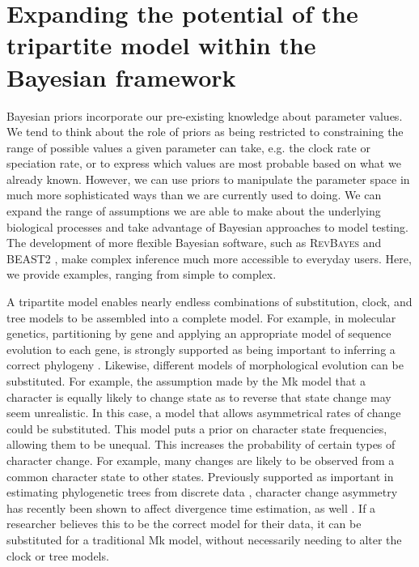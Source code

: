 \section{Expanding the potential of the tripartite model within the Bayesian framework}

Bayesian priors incorporate our pre-existing knowledge about parameter values. %
We tend to think about the role of priors as being restricted to  constraining the range of possible values a given parameter can take, e.g. the clock rate or speciation rate, or to express which values are most probable based on what we already known.
However, we can use priors to manipulate the parameter space in much more sophisticated ways than we are currently used to doing.
We can expand the range of assumptions we are able to make about the underlying biological processes and take advantage of Bayesian approaches to model testing.
The development of more flexible Bayesian software, such as \textsc{RevBayes} \citep{Hoehna2014b, Hoehna2016b} and BEAST2 \citep{BEAST2}, make complex inference much more accessible to everyday users.
Here, we provide examples, ranging from simple to complex.

A tripartite model enables nearly endless combinations of substitution, clock, and tree models to be assembled into a complete model.
For example, in molecular genetics, partitioning by gene and applying an appropriate model of sequence evolution to each gene, is strongly supported as being important to inferring a correct phylogeny \citep{Brandley2005}.
Likewise, different models of morphological evolution can be substituted.
For example, the assumption made by the Mk model that a character is equally likely to change state as to reverse that state change may seem unrealistic. 
In this case, a model that allows asymmetrical rates of change \citep{Ronquist2004} could be substituted. 
 This model puts a prior on character state frequencies, allowing them to be unequal.
 This increases the probability of certain types of character change.
 For example, many changes are likely to be observed from a common character state to other states.
Previously supported as important in estimating phylogenetic trees from discrete data \citep{Wright2016}, character change asymmetry has recently been shown to affect divergence time estimation, as well \citep{Klopfstein2019}. 
If a researcher believes this to be the correct model for their data, it can be substituted for a traditional Mk model, without necessarily needing to alter the clock or tree models. 

